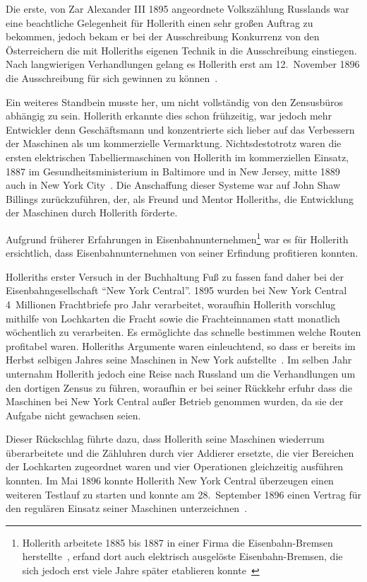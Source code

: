 \documentclass[parskip=half]{scrartcl}
\begin{document}
Die erste, von Zar Alexander III 1895 angeordnete Volkszählung Russlands war
eine beachtliche Gelegenheit für Hollerith einen sehr großen Auftrag zu
bekommen, jedoch bekam er bei der Ausschreibung Konkurrenz von den
Österreichern die mit Holleriths eigenen Technik in die Ausschreibung
einstiegen. Nach langwierigen Verhandlungen gelang es Hollerith erst am
12.~November 1896 die Ausschreibung für sich gewinnen zu
können~\cite{austrian1982herman}.

Ein weiteres Standbein musste her, um nicht vollständig von den Zensusbüros
abhängig zu sein. Hollerith erkannte dies schon frühzeitig, war jedoch mehr
Entwickler denn Geschäftsmann und konzentrierte sich lieber auf das Verbessern
der Maschinen als um kommerzielle Vermarktung. Nichtsdestotrotz waren die
ersten elektrischen Tabelliermaschinen von Hollerith im kommerziellen Einsatz,
1887 im Gesundheitsministerium in Baltimore und in New Jersey, mitte 1889 auch
in New York City~\cite{austrian1982herman}. Die Anschaffung dieser Systeme war
auf John Shaw Billings zurückzuführen, der, als Freund und Mentor Holleriths,
die Entwicklung der Maschinen durch Hollerith förderte.

Aufgrund früherer Erfahrungen in Eisenbahnunternehmen\footnote{Hollerith
arbeitete 1885 bis 1887 in einer Firma die Eisenbahn-Bremsen
herstellte~\cite{heide2009punched}, erfand dort auch elektrisch
ausgelöste Eisenbahn-Bremsen, die sich jedoch erst viele Jahre später
etablieren konnte~\cite{austrian1982herman}} war es für Hollerith
ersichtlich, dass Eisenbahnunternehmen von seiner Erfindung profitieren
konnten.

Holleriths erster Versuch in der Buchhaltung Fuß zu fassen fand daher bei der
Eisenbahngesellschaft \enquote{New York Central}. 1895 wurden bei New York
Central 4~Millionen Frachtbriefe pro Jahr verarbeitet, woraufhin Hollerith
vorschlug mithilfe von Lochkarten die Fracht sowie die Frachteinnamen statt
monatlich wöchentlich zu verarbeiten. Es ermöglichte das schnelle bestimmen
welche Routen profitabel waren. Holleriths Argumente waren einleuchtend, so
dass er bereits im Herbst selbigen Jahres seine Maschinen in New York
aufstellte~\cite{austrian1982herman}. Im selben Jahr unternahm Hollerith jedoch
eine Reise nach Russland um die Verhandlungen um den dortigen Zensus zu führen,
woraufhin er bei seiner Rückkehr erfuhr dass die Maschinen bei New York Central
außer Betrieb genommen wurden, da sie der Aufgabe nicht gewachsen seien.

Dieser Rückschlag führte dazu, dass Hollerith seine Maschinen wiederrum
überarbeitete und die Zähluhren durch vier Addierer ersetzte, die vier
Bereichen der Lochkarten zugeordnet waren und vier Operationen gleichzeitig
ausführen konnten. Im Mai 1896 konnte Hollerith New York Central überzeugen
einen weiteren Testlauf zu starten und konnte am 28.~September 1896 einen
Vertrag für den regulären Einsatz seiner Maschinen
unterzeichnen~\cite{austrian1982herman}.
\end{document}
